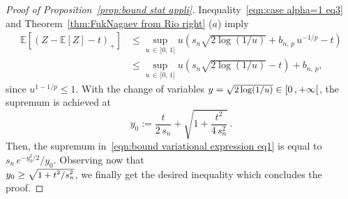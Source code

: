 \documentclass[10pt]{amsart}
\theoremstyle{definition}\newtheorem{defi}[theo]{Definition}\newtheorem{rema}[theo]{Remark}\newtheorem{exam}[theo]{Example}\newtheorem{exem}[theo]{Example}\newtheorem{nota}[theo]{Notation}
\newcommand{\bE}{\mathbb{E}}
\newcommand{\intervallefo}[2]{\mathopen{[} #1\mathclose{}\mathpunct{},#2\mathclose{[}}
\begin{document}
\begin{proof}[Proof of Proposition~\ref{prop:bound stat appli}]
Inequality~\eqref{eqn:case alpha=1 eq3} and Theorem~\ref{thm:FukNagaev from Rio right} ($a$) imply
\begin{equation}\label{eqn:bound variational expression eq1}
\begin{aligned}
\bE[(Z-\bE[Z]-t)_+]& \leq \sup_{u\,\in\,]0,\,1]} u\left(s_n\sqrt{2\log(1/u)}+b_{n,\,p}\,u^{-1/p} -t\right)\\\
&\leq \sup_{u\,\in\,]0,\,1]} u\left(s_n\sqrt{2\log(1/u)}-t\right)+b_{n,\,p},
\end{aligned}
\end{equation}
since $u^{1-1/p}\leq 1$. With the change of variables $y=\sqrt{\text{\small{$2\log(1/u)$}}}\in\intervallefo{0}{+\infty}$, the supremum is achieved at
\begin{equation}\label{eqn:bound variational expression eq2}
y_0:=\frac{t}{2\,s_n}+\sqrt{1+\frac{t^2}{4\,s_n^2}}\,.
\end{equation}
Then, the supremum in~\eqref{eqn:bound variational expression eq1} is equal to $s_n\,e^{-y_0^2/2}/y_0$. Observing now that\\ $y_0\geq \sqrt{\text{\small{$1+t^2/s_n^2$}}}$, we finally get the desired inequality which concludes the proof.
\end{proof}
\end{document}
